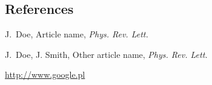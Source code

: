 \documentclass[final]{beamer}
\begin{document}
\begin{frame}[t]
\begin{multicols}{3}


\subsection{References}

\begin{thebibliography}{99}

 J.~Doe, Article name, \textit{Phys. Rev. Lett.}

 J.~Doe, J. Smith, Other article name, \textit{Phys. Rev. Lett.}

 \url{http://www.google.pl}

\end{thebibliography}

\end{multicols}

\end{frame}
\end{document}
